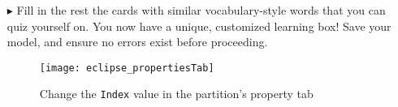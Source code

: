 \begin{itemize}
\item[$\blacktriangleright$] Fill in the rest the cards with similar vocabulary-style words that you can quiz yourself on. You now have a unique, customized
learning box! Save your model, and ensure no errors exist before proceeding.

\newpage

\vspace*{4cm}

\begin{figure}[htbp]
	\centering
  \texttt{[image: eclipse\_propertiesTab]}
	\caption{Change the \texttt{Index} value in the partition's property tab}
	\label{fig:properties_partition}
\end{figure}


\end{itemize}
